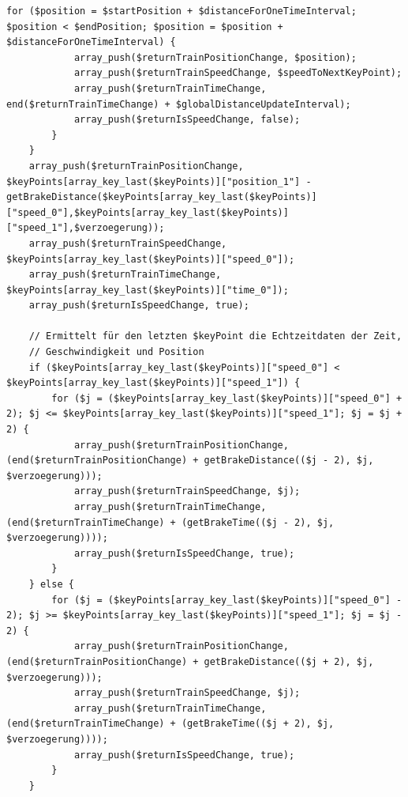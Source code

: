 \begin{lstlisting}[caption={\textit{createTrainChanges$($$)$} (\textit{functions\_fahrtverlauf.php})},captionpos=b,label={lst:createTrainChanges}]
		for ($position = $startPosition + $distanceForOneTimeInterval; $position < $endPosition; $position = $position + $distanceForOneTimeInterval) {
			array_push($returnTrainPositionChange, $position);
			array_push($returnTrainSpeedChange, $speedToNextKeyPoint);
			array_push($returnTrainTimeChange, end($returnTrainTimeChange) + $globalDistanceUpdateInterval);
			array_push($returnIsSpeedChange, false);
		}
	}
	array_push($returnTrainPositionChange, $keyPoints[array_key_last($keyPoints)]["position_1"] - getBrakeDistance($keyPoints[array_key_last($keyPoints)]["speed_0"],$keyPoints[array_key_last($keyPoints)]["speed_1"],$verzoegerung));
	array_push($returnTrainSpeedChange, $keyPoints[array_key_last($keyPoints)]["speed_0"]);
	array_push($returnTrainTimeChange, $keyPoints[array_key_last($keyPoints)]["time_0"]);
	array_push($returnIsSpeedChange, true);

	// Ermittelt für den letzten $keyPoint die Echtzeitdaten der Zeit,
	// Geschwindigkeit und Position
	if ($keyPoints[array_key_last($keyPoints)]["speed_0"] < $keyPoints[array_key_last($keyPoints)]["speed_1"]) {
		for ($j = ($keyPoints[array_key_last($keyPoints)]["speed_0"] + 2); $j <= $keyPoints[array_key_last($keyPoints)]["speed_1"]; $j = $j + 2) {
			array_push($returnTrainPositionChange, (end($returnTrainPositionChange) + getBrakeDistance(($j - 2), $j, $verzoegerung)));
			array_push($returnTrainSpeedChange, $j);
			array_push($returnTrainTimeChange, (end($returnTrainTimeChange) + (getBrakeTime(($j - 2), $j, $verzoegerung))));
			array_push($returnIsSpeedChange, true);
		}
	} else {
		for ($j = ($keyPoints[array_key_last($keyPoints)]["speed_0"] - 2); $j >= $keyPoints[array_key_last($keyPoints)]["speed_1"]; $j = $j - 2) {
			array_push($returnTrainPositionChange, (end($returnTrainPositionChange) + getBrakeDistance(($j + 2), $j, $verzoegerung)));
			array_push($returnTrainSpeedChange, $j);
			array_push($returnTrainTimeChange, (end($returnTrainTimeChange) + (getBrakeTime(($j + 2), $j, $verzoegerung))));
			array_push($returnIsSpeedChange, true);
		}
	}


\end{lstlisting}
